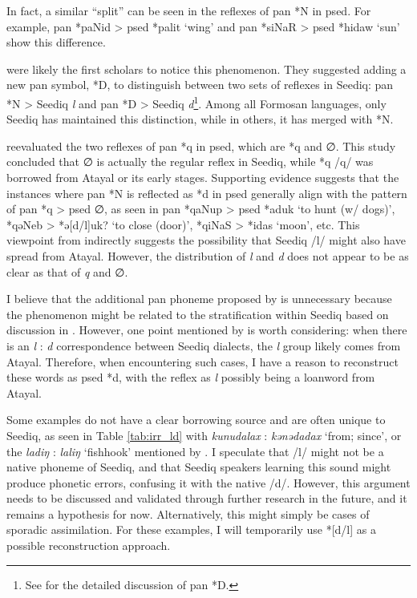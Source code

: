 In fact, a similar ``split'' can be seen in the reflexes of \acl{pan} *N in \acl{psed}. For example, \acs{pan} *paNid > \acs{psed} *palit `wing' and \acs{pan} *siNaR > \acs{psed} *hidaw `sun' show this difference.

\textcite{dyen1987d5} were likely the first scholars to notice this phenomenon. They suggested adding a new \acs{pan} symbol, *D, to distinguish between two sets of reflexes in Seediq: \acs{pan} *N > Seediq \textit{l} and \acs{pan} *D > Seediq \textit{d}\footnote{See \textcite{tsuchida1976tsouic} for the detailed discussion of \acs{pan} *D. }. Among all Formosan languages, only Seediq has maintained this distinction, while in others, it has merged with *N.

\textcite{song2024sedq} reevaluated the two reflexes of \acl{pan} *q in \acl{psed}, which are *q and ∅. This study concluded that ∅ is actually the regular reflex in Seediq, while *q /q/ was borrowed from Atayal or its early stages. Supporting evidence suggests that the instances where \acl{pan} *N is reflected as *d in \acl{psed} generally align with the pattern of \acs{pan} *q > \acs{psed} ∅, as seen in \acs{pan} *qaNup > \acs{psed} *aduk `to hunt (w/ dogs)', *qəNeb > *ə[d/l]uk? `to close (door)', *qiNaS > *idas `moon', etc. This viewpoint from \textcite{song2024sedq} indirectly suggests the possibility that Seediq /l/ might also have spread from Atayal. However, the distribution of \textit{l} and \textit{d} does not appear to be as clear as that of \textit{q} and ∅.

I believe that the additional \acs{pan} phoneme proposed by \textcite{dyen1987d5} is unnecessary because the phenomenon might be related to the stratification within Seediq based on discussion in \textcite{song2024sedq}. However, one point mentioned by \textcite{dyen1987d5} is worth considering: when there is an \textit{l} : \textit{d} correspondence between Seediq dialects, the \textit{l} group likely comes from Atayal. Therefore, when encountering such cases, I have a reason to reconstruct these words as \acl{psed} *d, with the reflex as \textit{l} possibly being a loanword from Atayal.

Some examples do not have a clear borrowing source and are often unique to Seediq, as seen in Table \ref{tab:irr_ld} with \textit{kunudalax} : \textit{kənədadax} `from; since', or the \textit{ladiŋ} : \textit{laliŋ} `fishhook' mentioned by \textcite[175]{dyen1987d5}. I speculate that /l/ might not be a native phoneme of Seediq, and that Seediq speakers learning this sound might produce phonetic errors, confusing it with the native /d/. However, this argument needs to be discussed and validated through further research in the future, and it remains a hypothesis for now. Alternatively, this might simply be cases of sporadic assimilation. For these examples, I will temporarily use *[d/l] as a possible reconstruction approach.

